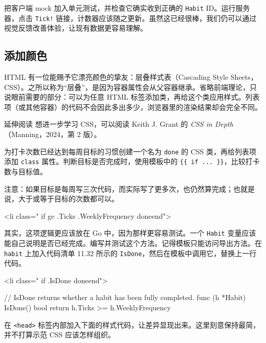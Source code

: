 把客户端 mock 加入单元测试，并检查它确实收到正确的 \texttt{Habit} ID。运行服务器，点击 \texttt{Tick!} 链接，计数器应该随之更新。虽然这已经很棒，我们仍可以通过视觉反馈改善体验，让现有数据更容易理解。

\subsection{添加颜色}

HTML 有一位能赐予它漂亮颜色的挚友：层叠样式表（Cascading Style Sheets，CSS）。之所以称为“层叠”，是因为容器属性会从父容器继承。省略前端理论，只说眼前需要的部分：可以为任意 HTML 标签添加类，再给这个类应用样式。列表项（或其他容器）的代码不会因此多出多少，浏览器里的渲染结果却会完全不同。

\begin{tipbox}{延伸阅读}
想进一步学习 CSS，可以阅读 Keith J. Grant 的 \emph{CSS in Depth}（Manning，2024，第 2 版）。
\end{tipbox}

为打卡次数已经达到每周目标的习惯创建一个名为 \texttt{done} 的 CSS 类，再给列表项添加 \texttt{class} 属性。判断目标是否完成时，使用模板中的 \texttt{\{\{ if ... \}\}}，比较打卡数与目标值。

注意：如果目标是每周写三次代码，而实际写了更多次，也仍然算完成；也就是说，大于或等于目标的次数都可以。

\begin{htmlcode}[]
<li class="{{ if ge .Ticks .WeeklyFrequency }}done{{end}}">
\end{htmlcode}

其实，这项逻辑更应该放在 Go 中，因为那样更容易测试。一个 \texttt{Habit} 变量应该能自己说明是否已经完成。编写并测试这个方法。记得模板只能访问导出方法。在 \texttt{habit} 上加入代码清单 11.32 所示的 \texttt{IsDone}，然后在模板中调用它，替换上一行代码。

\begin{htmlcode}[]
<li class="{{ if .IsDone }}done{{end}}">
\end{htmlcode}

\begin{gocode}[title={代码清单 11.32 \texttt{habit.go}：暴露习惯是否完成}]
// IsDone returns whether a habit has been fully completed.
func (h *Habit) IsDone() bool {
    return h.Ticks >= h.WeeklyFrequency
}
\end{gocode}

在 \texttt{<head>} 标签内部加入下面的样式代码，让差异显现出来。这里刻意保持最简，并不打算示范 CSS 应该怎样组织。

